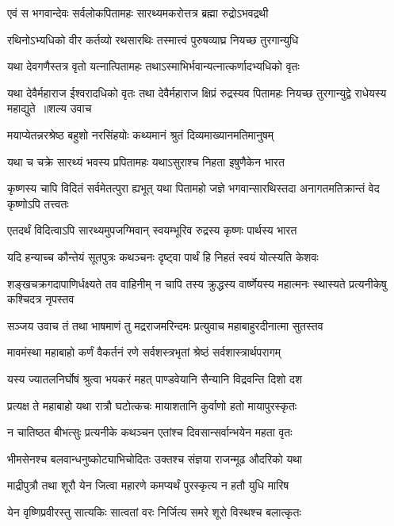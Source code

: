 \twolineshloka
{एवं स भगवान्देवः सर्वलोकपितामहः}
{सारथ्यमकरोत्तत्र ब्रह्मा रुद्रोऽभवद्रथी}


\twolineshloka
{रथिनोऽभ्यधिको वीर कर्तव्यो रथसारथिः}
{तस्मात्त्वं पुरुषव्याघ्र नियच्छ तुरगान्युधि}


\twolineshloka
{यथा देवगणैस्तत्र वृतो यत्नात्पितामहः}
{तथाऽस्माभिर्भवान्यत्नात्कर्णादभ्यधिको वृतः}


\fourlineindentedshloka
{यथा देवैर्महाराज ईश्वरादधिको वृतः}
{तथा देवैर्महाराज क्षिप्रं रुद्रस्यव पितामहः}
{नियच्छ तुरगान्युद्वे राधेयस्य महाद्युते ॥शल्य उवाच}
{}


\twolineshloka
{मयाप्येतन्नरश्रेष्ठ बहुशो नरसिंहयोः}
{कथ्यमानं श्रुतं दिव्यमाख्यानमतिमानुषम्}


\twolineshloka
{यथा च चक्रे सारथ्यं भवस्य प्रपितामहः}
{यथाऽसुराश्च निहता इषुणैकेन भारत}


कृष्णस्य चापि विदितं सर्वमेतत्पुरा ह्यभूत्
\twolineshloka
{यथा पितामहो जज्ञे भगवान्सारथिस्तदा}
{अनागतमतिक्रान्तं वेद कृष्णोऽपि तत्त्वतः}


\twolineshloka
{एतदर्थं विदित्वाऽपि सारथ्यमुपजग्मिवान्}
{स्वयम्भूरिव रुद्रस्य कृष्णः पार्थस्य भारत}


\twolineshloka
{यदि हन्याच्च कौन्तेयं सूतपुत्रः कथञ्चनः}
{दृष्ट्वा पार्थं हि निहतं स्वयं योत्स्यति केशवः}


\threelineshloka
{शङ्खचक्रगदापाणिर्धक्ष्यते तव वाहिनीम्}
{न चापि तस्य क्रुद्धस्य वार्ष्णेयस्य महात्मनः}
{स्थास्यते प्रत्यनीकेषु कश्चिदत्र नृपस्तव}


\threelineshloka
{सञ्जय उवाच}
{तं तथा भाषमाणं तु मद्रराजमरिन्दमः}
{प्रत्युवाच महाबाहुरदीनात्मा सुतस्तव}


\twolineshloka
{मावमंस्था महाबाहो कर्णं वैकर्तनं रणे}
{सर्वशस्त्रभृतां श्रेष्ठं सर्वशास्त्रार्थपरागम्}


\twolineshloka
{यस्य ज्यातलनिर्घोषं श्रुत्वा भयकरं महत्}
{पाण्डवेयानि सैन्यानि विद्रवन्ति दिशो दश}


\twolineshloka
{प्रत्यक्ष ते महाबाहो यथा रात्रौ घटोत्कचः}
{मायाशतानि कुर्वाणो हतो मायापुरस्कृतः}


\twolineshloka
{न चातिष्ठत बीभत्सुः प्रत्यनीके कथञ्चन}
{एतांश्च दिवसान्सर्वान्भयेन महता वृतः}


\twolineshloka
{भीमसेनश्च बलवान्धनुष्कोट्याभिचोदितः}
{उक्तश्च संज्ञया राजन्मूढ औदरिको यथा}


\twolineshloka
{माद्रीपुत्रौ तथा शूरौ येन जित्वा महारणे}
{कमप्यर्थं पुरस्कृत्य न हतौ युधि मारिष}


\twolineshloka
{येन वृष्णिप्रवीरस्तु सात्यकिः सात्वतां वरः}
{निर्जित्य समरे शूरो विस्थश्च बलात्कृतः}


